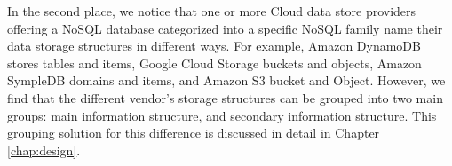 In the second place, we notice that one or more Cloud data store providers offering a \ac{NoSQL} database categorized into a specific \ac{NoSQL} family name their data storage structures in different ways. For example, Amazon DynamoDB stores tables and items, Google Cloud Storage buckets and objects, Amazon SympleDB domains and items, and Amazon S3 bucket and Object. However, we find that the different vendor's storage structures can be grouped into two main groups: main information structure, and secondary information structure. This grouping solution for this difference is discussed in detail in Chapter \ref{chap:design}.

\clearpage  
